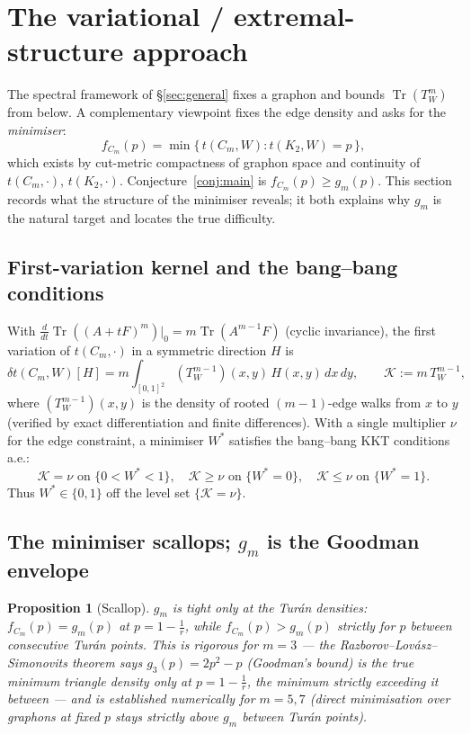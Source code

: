 \documentclass[11pt]{article}
\newtheorem{proposition}[theorem]{Proposition}
\newcommand{\Tr}{\operatorname{Tr}}
\begin{document}
\section{The variational / extremal-structure approach}\label{sec:variational}

The spectral framework of \S\ref{sec:general} fixes a graphon and bounds $\Tr(T_W^m)$ from below.  A complementary viewpoint fixes the edge density and asks for the \emph{minimiser}:
\[
        f_{C_m}(p)=\min\{\,t(C_m,W):t(K_2,W)=p\,\},
\]
which exists by cut-metric compactness of graphon space and continuity of $t(C_m,\cdot)$, $t(K_2,\cdot)$.  Conjecture~\ref{conj:main} is $f_{C_m}(p)\ge g_m(p)$.  This section records what the structure of the minimiser reveals; it both explains why $g_m$ is the natural target and locates the true difficulty.

\subsection{First-variation kernel and the bang--bang conditions}

With $\tfrac{d}{dt}\Tr((A+tF)^m)|_0=m\Tr(A^{m-1}F)$ (cyclic invariance), the first variation of $t(C_m,\cdot)$ in a symmetric direction $H$ is
\begin{equation}\label{eq:first-variation-Cm}
        \delta t(C_m,W)[H]=m\!\int_{[0,1]^2}\!(T_W^{m-1})(x,y)\,H(x,y)\,dx\,dy,
        \qquad \mathcal K:=m\,T_W^{m-1},
\end{equation}
where $(T_W^{m-1})(x,y)$ is the density of rooted $(m-1)$-edge walks from $x$ to $y$ (verified by exact differentiation and finite differences).  With a single multiplier $\nu$ for the edge constraint, a minimiser $W^*$ satisfies the bang--bang KKT conditions a.e.:
\[
        \mathcal K=\nu \text{ on } \{0<W^*<1\},\quad
        \mathcal K\ge\nu \text{ on } \{W^*=0\},\quad
        \mathcal K\le\nu \text{ on } \{W^*=1\}.
\]
Thus $W^*\in\{0,1\}$ off the level set $\{\mathcal K=\nu\}$.

\subsection{The minimiser scallops; $g_m$ is the Goodman envelope}\label{subsec:scallop}

\begin{proposition}[Scallop]\label{prop:scallop}
$g_m$ is tight only at the Tur\'an densities: $f_{C_m}(p)=g_m(p)$ at $p=1-\tfrac1r$, while $f_{C_m}(p)>g_m(p)$ strictly for $p$ between consecutive Tur\'an points.  This is rigorous for $m=3$ --- the Razborov--Lov\'asz--Simonovits theorem says $g_3(p)=2p^2-p$ (Goodman's bound) is the true minimum triangle density only at $p=1-\tfrac1r$, the minimum strictly exceeding it between --- and is established numerically for $m=5,7$ (direct minimisation over graphons at fixed $p$ stays strictly above $g_m$ between Tur\'an points).
\end{proposition}
\end{document}
